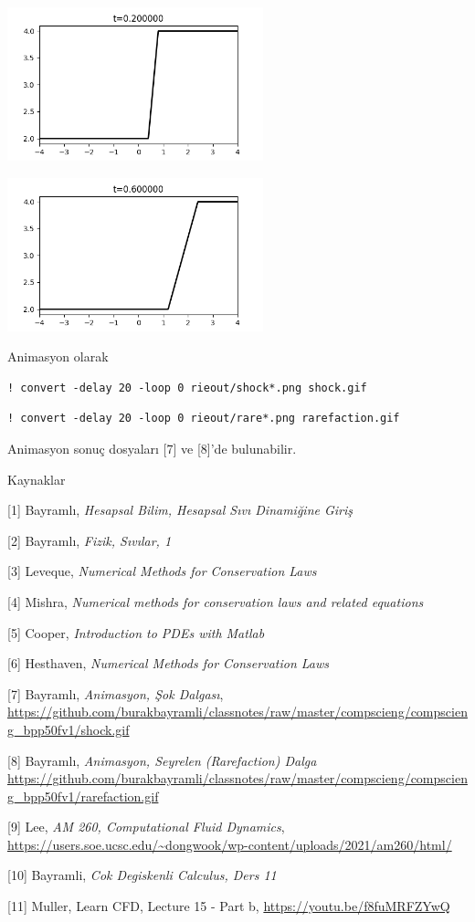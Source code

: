 \documentclass[12pt,fleqn]{article}\usepackage{../../common}
\begin{document}
\includegraphics[width=20em]{rieout/rarefaction-02.png}

\includegraphics[width=20em]{rieout/rarefaction-06.png}

Animasyon olarak

\begin{verbatim}
! convert -delay 20 -loop 0 rieout/shock*.png shock.gif
\end{verbatim}

\begin{verbatim}
! convert -delay 20 -loop 0 rieout/rare*.png rarefaction.gif
\end{verbatim}

Animasyon sonuç dosyaları [7] ve [8]'de bulunabilir.

Kaynaklar

[1] Bayramlı, {\em Hesapsal Bilim, Hesapsal Sıvı Dinamiğine Giriş}

[2] Bayramlı, {\em Fizik, Sıvılar, 1}

[3] Leveque, {\em Numerical Methods for Conservation Laws}

[4] Mishra, {\em Numerical methods for conservation laws and related equations}

[5] Cooper, {\em Introduction to PDEs with Matlab}

[6] Hesthaven, {\em Numerical Methods for Conservation Laws}

[7] Bayramlı, {\em Animasyon, Şok Dalgası},
    \url{https://github.com/burakbayramli/classnotes/raw/master/compscieng/compscieng_bpp50fv1/shock.gif}

[8] Bayramlı, {\em Animasyon, Seyrelen (Rarefaction) Dalga}
    \url{https://github.com/burakbayramli/classnotes/raw/master/compscieng/compscieng_bpp50fv1/rarefaction.gif}

[9] Lee, {\em AM 260, Computational Fluid Dynamics},
    \url{https://users.soe.ucsc.edu/~dongwook/wp-content/uploads/2021/am260/html/}

[10] Bayramli, {\em Cok Degiskenli Calculus, Ders 11}

[11] Muller, {Learn CFD, Lecture 15 - Part b},
     \url{https://youtu.be/f8fuMRFZYwQ}
    
\end{document}
